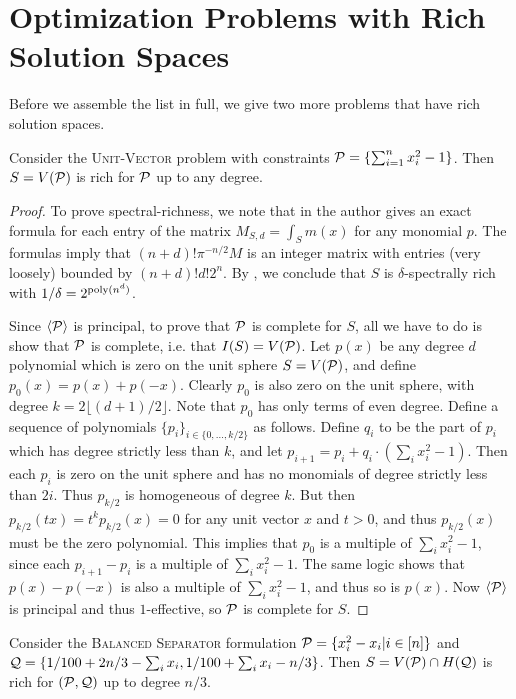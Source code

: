 \section{Optimization Problems with Rich Solution Spaces}
Before we assemble the list in full, we give two more problems that have rich solution spaces.
\begin{lemma}
Consider the \textsc{Unit-Vector} problem with constraints $\mathcal P = \{\sum_{i=1}^n x_i^2 - 1\}$. Then $S = V(\mathcal P)$ is rich for $\mathcal P$ up to any degree. 
\end{lemma}
\begin{proof}
To prove spectral-richness, we note that in \cite{Foll01} the author gives an exact formula for each entry of the matrix $M_{S,d} = \int_{S} m(x)$ for any monomial $p$. The formulas imply that $(n+d)!\pi^{-n/2} M$ is an integer matrix with entries (very loosely) bounded by $(n+d)!d!2^n$. By , we conclude that $S$ is $\delta$-spectrally rich with $1/\delta = 2^{\operatorname{poly}(n^d)}$.

Since $\langle \mathcal P \rangle$ is principal, to prove that $\mathcal P$ is complete for $S$, all we have to do is show that $\mathcal P$ is complete, i.e. that $I(S) = V(\mathcal P)$. Let $p(x)$ be any degree $d$ polynomial which is zero on the unit sphere $S = V(\mathcal P)$, and define $p_0(x) = p(x) + p(-x)$. Clearly $p_0$ is also zero on the unit sphere, with degree $k = 2\lfloor (d+1)/2 \rfloor$. Note that $p_0$ has only terms of even degree. 
%
Define a sequence of polynomials $\{p_i\}_{i \in \{0,\ldots, k/2\}}$ as follows.
Define $q_i$ to be the part of $p_i$ which has degree strictly less than $k$, and let $p_{i+1} = p_i + q_i\cdot(\sum_i x_i^2 - 1)$. Then each $p_i$ is zero on the unit sphere and has no monomials of degree strictly less than $2i$. Thus $p_{k/2}$ is homogeneous of degree $k$. But then $p_{k/2}(tx) = t^kp_{k/2}(x) = 0$ for any unit vector $x$ and $t > 0$, and thus $p_{k/2}(x)$ must be the zero polynomial. This implies that $p_0$ is a multiple of $\sum_i x_i^2 - 1$, since each $p_{i+1} - p_i$ is a multiple of $\sum_i x_i^2 -1$. The same logic shows that $p(x) - p(-x)$ is also a multiple of $\sum_i x_i^2 - 1$, and thus so is $p(x)$. Now $\langle \mathcal P\rangle$ is principal and thus $1$-effective, so $\mathcal P$ is complete for $S$. 
\end{proof}
\begin{lemma}
Consider the \textsc{Balanced Separator} formulation $\mathcal P = \{x_i^2 - x_i| i \in [n]\}$ and $\mathcal Q = \{1/100 + 2n/3 - \sum_i x_i, 1/100 + \sum_i x_i - n/3\}$. Then $S = V(\mathcal P) \cap H(\mathcal Q)$ is rich for $(\mathcal P, \mathcal Q)$ up to degree $n/3$.
\end{lemma}
